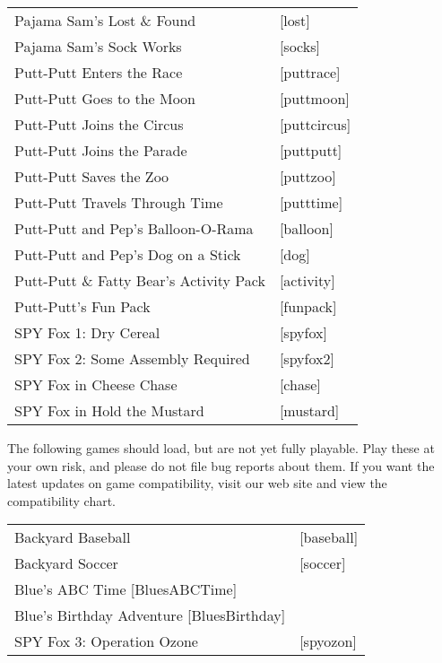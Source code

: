 \begin{itemize}
\begin{tabular}[h]{ll}
    Pajama Sam's Lost \& Found&                    [lost]\\
    Pajama Sam's Sock Works&                       [socks]\\
    Putt-Putt Enters the Race&                     [puttrace]\\
    Putt-Putt Goes to the Moon&                    [puttmoon]\\
    Putt-Putt Joins the Circus&                    [puttcircus]\\
    Putt-Putt Joins the Parade&                    [puttputt]\\
    Putt-Putt Saves the Zoo&                       [puttzoo]\\
    Putt-Putt Travels Through Time&                [putttime]\\
    Putt-Putt and Pep's Balloon-O-Rama&            [balloon]\\
    Putt-Putt and Pep's Dog on a Stick&            [dog]\\
    Putt-Putt \& Fatty Bear's Activity Pack&       [activity]\\
    Putt-Putt's Fun Pack&                          [funpack]\\
    SPY Fox 1: Dry Cereal&                         [spyfox]\\
    SPY Fox 2: Some Assembly Required&             [spyfox2]\\
    SPY Fox in Cheese Chase&                       [chase]\\
    SPY Fox in Hold the Mustard&                   [mustard]\\
  \end{tabular}

The following games should load, but are not yet fully playable. Play these at
your own risk, and please do not file bug reports about them. If you want
the latest updates on game compatibility, visit our web site and view the
compatibility chart.

  \begin{tabular}{ll}
    Backyard Baseball&                             [baseball]\\
    Backyard Soccer&                               [soccer]\\
    Blue's ABC Time                                [BluesABCTime]\\
    Blue's Birthday Adventure                      [BluesBirthday]\\
    SPY Fox 3: Operation Ozone&                    [spyozon]\\
  \end{tabular}


\end{itemize}
